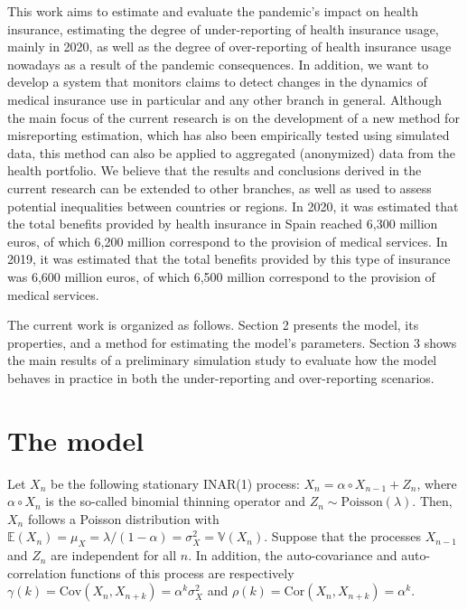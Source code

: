 \documentclass[12pt,twoside, A4paper]{article}
\begin{document}
This work aims to estimate and evaluate the pandemic's impact on health insurance, estimating the degree of under-reporting of health insurance usage, mainly in 2020, as well as the degree of over-reporting of health insurance usage nowadays as a result of the pandemic consequences. In addition, we want to develop a system that monitors claims to detect changes in the dynamics of medical insurance use in particular and any other branch in general. Although the main focus of the current research is on the development of a new method for misreporting estimation, which has also been empirically tested using simulated data, this method can also be applied to aggregated (anonymized) data from the health portfolio. We believe that the results and conclusions derived in the current research can be extended to other branches, as well as used to assess potential inequalities between countries or regions. In 2020, it was estimated that the total benefits provided by health insurance in Spain reached 6,300 million euros, of which 6,200 million correspond to the provision of medical services. In 2019, it was estimated that the total benefits provided by this type of insurance was 6,600 million euros, of which 6,500 million correspond to the provision of medical services.

The current work is organized as follows. Section 2 presents the model, its properties, and a method for estimating the model's parameters. Section 3 shows the main results of a preliminary
 simulation study to evaluate how the model behaves in practice in both the under-reporting and over-reporting scenarios. 


\section{The model}

\noindent Let $X_n$ be the following stationary INAR(1) process: $X_n=\alpha\circ X_{n-1}+Z_n$, where $\alpha \circ X_n$ is the so-called binomial thinning operator and $Z_n \sim \textrm{Poisson}(\lambda)$. Then, $X_n$ follows a Poisson distribution with $\mathbb{E}(X_n)=\mu_X=\lambda/(1-\alpha)=\sigma_X^2=\mathbb{V}(X_n)$. Suppose that the processes $X_{n-1}$ and $Z_n$ are independent for all $n$. In addition, the auto-covariance and auto-correlation functions of this process are respectively $\gamma(k)=\textrm{Cov}(X_n,X_{n+k})=\alpha^k \sigma_X^2$ and $\rho(k)=\textrm{Cor}(X_n,X_{n+k})=\alpha^k$. 
\end{document}
